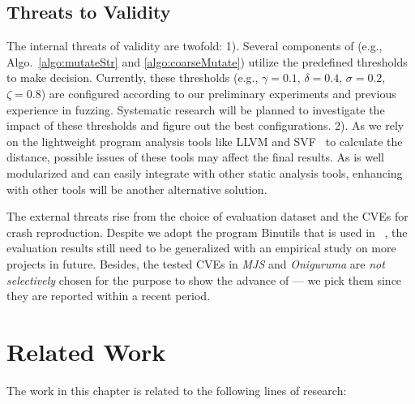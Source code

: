 \subsection{Threats to Validity}

The internal threats of validity are twofold:  1).  Several components of \dFOT (e.g., Algo.~\ref{algo:mutateStr} and \ref{algo:coarseMutate}) utilize  the predefined thresholds to make decision. Currently, these thresholds (e.g., $\gamma=0.1$, $\delta=0.4$, $\sigma=0.2$, $\zeta=0.8$) are configured according to our preliminary experiments and  previous experience in fuzzing. Systematic research will be planned to investigate the impact of these thresholds and figure out the best configurations. 
2). As we rely on the lightweight program analysis tools like LLVM and SVF~\cite{Sui:2016:SVF} to calculate the distance, possible issues of these tools may affect the final results.  As \dFOT is well modularized and can easily integrate with other static analysis tools, enhancing \dFOT with other tools will be another alternative solution. 

The external threats rise from the choice of evaluation dataset and the CVEs for crash reproduction. Despite we adopt the program Binutils that is used in \aflgo~\cite{Bohme:2017:DGF}, the evaluation results still need to be generalized with an empirical study on more projects in future. Besides, the tested CVEs in \emph{MJS} and  \emph{Oniguruma} are \emph{not selectively} chosen for the purpose to show the advance of \dFOT --- we pick them since they are reported within a recent period. 

\section{Related Work}

The work in this chapter is related to the following lines of research:

